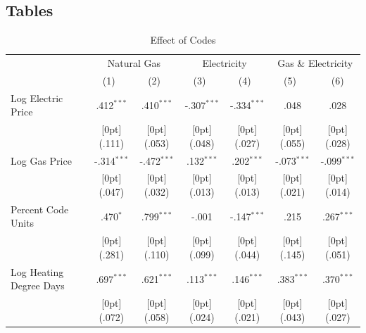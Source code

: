 \documentclass[10pt]{article}
\begin{document}
\subsection{Tables}

\begin{table}[h!]\footnotesize
\caption{Effect of Codes}
\label{main}
\begin{tabular*}{\textwidth}{@{\extracolsep{\fill}}lcccccc} \toprule    
& \multicolumn{2}{c}{Natural Gas} & \multicolumn{2}{c}{Electricity} &   \multicolumn{2}{c}{Gas \& Electricity} \\               
\cmidrule{2-7}                      
    & \multicolumn{1}{c}{(1)\mbox{\ }} &    \multicolumn{1}{c}{(2)\mbox{\ }} &  \multicolumn{1}{c}{(3)\mbox{\ }} &  \multicolumn{1}{c}{(4)\mbox{\ }} &  \multicolumn{1}{c}{(5)\mbox{\ }} &  \multicolumn{1}{c}{(6)} \\
\midrule                    
Log Electric Price &    .412$^{***}$ &  .410$^{***}$ &  -.307$^{***}$ & -.334$^{***}$ & .048 &  .028 \\
&   \raisebox{.7ex}[0pt]{\scriptsize (.111)} &  \raisebox{.7ex}[0pt]{\scriptsize (.053)} &  \raisebox{.7ex}[0pt]{\scriptsize (.048)} &  \raisebox{.7ex}[0pt]{\scriptsize (.027)} &  \raisebox{.7ex}[0pt]{\scriptsize (.055)} &  \raisebox{.7ex}[0pt]{\scriptsize (.028)} \\
Log Gas Price & -.314$^{***}$ & -.472$^{***}$ & .132$^{***}$ &  .202$^{***}$ &  -.073$^{***}$ & -.099$^{***}$ \\
&   \raisebox{.7ex}[0pt]{\scriptsize (.047)} &  \raisebox{.7ex}[0pt]{\scriptsize (.032)} &  \raisebox{.7ex}[0pt]{\scriptsize (.013)} &  \raisebox{.7ex}[0pt]{\scriptsize (.013)} &  \raisebox{.7ex}[0pt]{\scriptsize (.021)} &  \raisebox{.7ex}[0pt]{\scriptsize (.014)} \\
Percent Code Units &    .470$^{*}$ &    .799$^{***}$ &  -.001 & -.147$^{***}$ & .215 &  .267$^{***}$ \\
&   \raisebox{.7ex}[0pt]{\scriptsize (.281)} &  \raisebox{.7ex}[0pt]{\scriptsize (.110)} &  \raisebox{.7ex}[0pt]{\scriptsize (.099)} &  \raisebox{.7ex}[0pt]{\scriptsize (.044)} &  \raisebox{.7ex}[0pt]{\scriptsize (.145)} &  \raisebox{.7ex}[0pt]{\scriptsize (.051)} \\
Log Heating Degree Days &   .697$^{***}$ &  .621$^{***}$ &  .113$^{***}$ &  .146$^{***}$ &  .383$^{***}$ &  .370$^{***}$ \\
&   \raisebox{.7ex}[0pt]{\scriptsize (.072)} &  \raisebox{.7ex}[0pt]{\scriptsize (.058)} &  \raisebox{.7ex}[0pt]{\scriptsize (.024)} &  \raisebox{.7ex}[0pt]{\scriptsize (.021)} &  \raisebox{.7ex}[0pt]{\scriptsize (.043)} &  \raisebox{.7ex}[0pt]{\scriptsize (.027)} \\

\end{tabular*}
\end{table}
\end{document}
